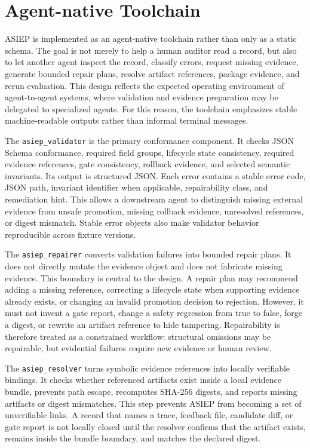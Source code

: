 \section{Agent-native Toolchain}

ASIEP is implemented as an agent-native toolchain rather than only as a static schema. The goal is not merely to help a human auditor read a record, but also to let another agent inspect the record, classify errors, request missing evidence, generate bounded repair plans, resolve artifact references, package evidence, and rerun evaluation. This design reflects the expected operating environment of agent-to-agent systems, where validation and evidence preparation may be delegated to specialized agents. For this reason, the toolchain emphasizes stable machine-readable outputs rather than informal terminal messages.

The \texttt{asiep\_validator} is the primary conformance component. It checks JSON Schema conformance, required field groups, lifecycle state consistency, required evidence references, gate consistency, rollback evidence, and selected semantic invariants. Its output is structured JSON. Each error contains a stable error code, JSON path, invariant identifier when applicable, repairability class, and remediation hint. This allows a downstream agent to distinguish missing external evidence from unsafe promotion, missing rollback evidence, unresolved references, or digest mismatch. Stable error objects also make validator behavior reproducible across fixture versions.

The \texttt{asiep\_repairer} converts validation failures into bounded repair plans. It does not directly mutate the evidence object and does not fabricate missing evidence. This boundary is central to the design. A repair plan may recommend adding a missing reference, correcting a lifecycle state when supporting evidence already exists, or changing an invalid promotion decision to rejection. However, it must not invent a gate report, change a safety regression from true to false, forge a digest, or rewrite an artifact reference to hide tampering. Repairability is therefore treated as a constrained workflow: structural omissions may be repairable, but evidential failures require new evidence or human review.

The \texttt{asiep\_resolver} turns symbolic evidence references into locally verifiable bindings. It checks whether referenced artifacts exist inside a local evidence bundle, prevents path escape, recomputes SHA-256 digests, and reports missing artifacts or digest mismatches. This step prevents ASIEP from becoming a set of unverifiable links. A record that names a trace, feedback file, candidate diff, or gate report is not locally closed until the resolver confirms that the artifact exists, remains inside the bundle boundary, and matches the declared digest.

